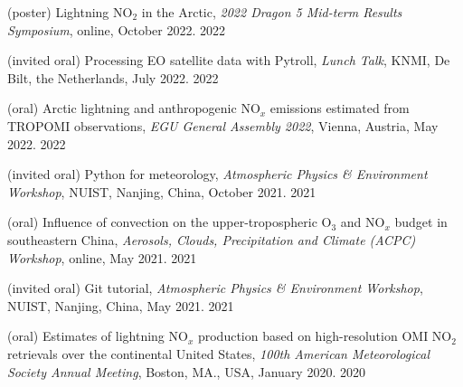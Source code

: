 \clearpage
{}


\begin{cvpublications}

\publication
{(poster) Lightning NO$_2$ in the Arctic,
\emph{2022 Dragon 5 Mid-term Results Symposium},
online, October 2022.} %
{2022} %

\publication
{(invited oral) Processing EO satellite data with Pytroll,
\emph{Lunch Talk},
KNMI, De Bilt, the Netherlands, July 2022.} %
{2022} %

\publication
{(oral) Arctic lightning and anthropogenic NO$_x$ emissions estimated from TROPOMI observations,
\emph{EGU General Assembly 2022},
Vienna, Austria, May 2022.} %
{2022} %

\publication
{(invited oral) Python for meteorology,
\emph{Atmospheric Physics \& Environment Workshop},
NUIST, Nanjing, China, October 2021.} %
{2021} %

\publication
{(oral) Influence of convection on the upper-tropospheric O$_3$ and NO$_x$ budget in southeastern China,
\emph{Aerosols, Clouds, Precipitation and Climate (ACPC) Workshop},
online, May 2021.} %
{2021} %

\publication
{(invited oral) Git tutorial,
\emph{Atmospheric Physics \& Environment Workshop},
NUIST, Nanjing, China, May 2021.} %
{2021} %

\publication
{(oral) Estimates of lightning NO$_x$ production based on high-resolution OMI NO$_2$ retrievals over the continental United States,
\emph{100th American Meteorological Society Annual Meeting},
Boston, MA., USA, January 2020.} %
{2020} %



\end{cvpublications}
